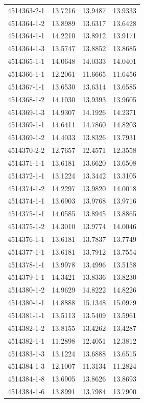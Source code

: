 \begin{longtable}{lrrr}
4514363-2-1 & 13.7216 & 13.9487 & 13.9333 \\
4514364-1-2 & 13.8989 & 13.6317 & 13.6428 \\
4514364-1-1 & 14.2210 & 13.8912 & 13.9171 \\
4514364-1-3 & 13.5747 & 13.8852 & 13.8685 \\
4514365-1-1 & 14.0648 & 14.0333 & 14.0401 \\
4514366-1-1 & 12.2061 & 11.6665 & 11.6456 \\
4514367-1-1 & 13.6530 & 13.6314 & 13.6585 \\
4514368-1-2 & 14.1030 & 13.9393 & 13.9605 \\
4514369-1-3 & 14.9307 & 14.1926 & 14.2371 \\
4514369-1-1 & 14.6411 & 14.7860 & 14.8203 \\
4514369-1-2 & 14.4033 & 13.8326 & 13.7931 \\
4514370-2-2 & 12.7657 & 12.4571 & 12.3558 \\
4514371-1-1 & 13.6181 & 13.6620 & 13.6508 \\
4514372-1-1 & 13.1224 & 13.3442 & 13.3105 \\
4514374-1-2 & 14.2297 & 13.9820 & 14.0018 \\
4514374-1-1 & 13.6903 & 13.9768 & 13.9716 \\
4514375-1-1 & 14.0585 & 13.8945 & 13.8865 \\
4514375-1-2 & 14.3010 & 13.9774 & 14.0046 \\
4514376-1-1 & 13.6181 & 13.7837 & 13.7749 \\
4514377-1-1 & 13.6181 & 13.7912 & 13.7554 \\
4514378-1-1 & 13.9978 & 13.4996 & 13.5158 \\
4514379-1-1 & 14.3421 & 13.8336 & 13.8230 \\
4514380-1-2 & 14.9629 & 14.8222 & 14.8226 \\
4514380-1-1 & 14.8888 & 15.1348 & 15.0979 \\
4514381-1-1 & 13.5113 & 13.5409 & 13.5961 \\
4514382-1-2 & 13.8155 & 13.4262 & 13.4287 \\
4514382-1-1 & 11.2898 & 12.4051 & 12.3812 \\
4514383-1-3 & 13.1224 & 13.6888 & 13.6515 \\
4514384-1-3 & 12.1007 & 11.3134 & 11.2824 \\
4514384-1-8 & 13.6905 & 13.8626 & 13.8693 \\
4514384-1-6 & 13.8991 & 13.7984 & 13.7900 \\

\end{longtable}
